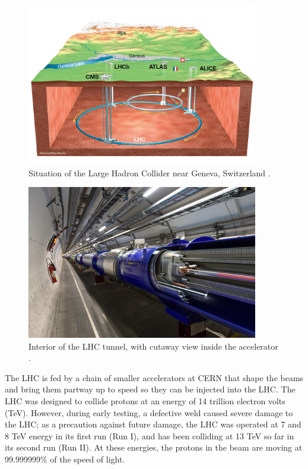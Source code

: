 \begin{figure}[htb]
\centering
\includegraphics[width=0.9\textwidth]{figures/lhc-from-above.png}
\caption[Situation of the Large Hadron Collider near Geneva,
Switzerland.]{Situation of the Large Hadron Collider near Geneva,
  Switzerland \cite{cernphotos}.}
\label{fig:lhc:above}
\end{figure}

\begin{figure}[htb]
\centering
\includegraphics[width=0.9\textwidth]{figures/lhc-tunnel-cutaway.png}
\caption[Interior of the LHC tunnel, with cutaway view inside the
  accelerator.]{Interior of the LHC tunnel, with cutaway view inside
    the accelerator \cite{cernphotos}.}
\label{fig:lhc:cutaway}
\end{figure}

The LHC is fed by a chain of smaller accelerators at CERN that shape
the beams and bring them partway up to speed so they can be injected
into the LHC. The LHC was designed to collide protons at an energy of
14 trillion electron volts (TeV). However, during early testing, a
defective weld caused severe damage to the LHC; as a precaution
against future damage, the LHC was operated at 7 and 8 TeV energy in
its first run (Run I), and has been colliding at 13 TeV so far in its
second run (Run II). At these energies, the protons in the beam are
moving at 99.999999\% of the speed of light.

